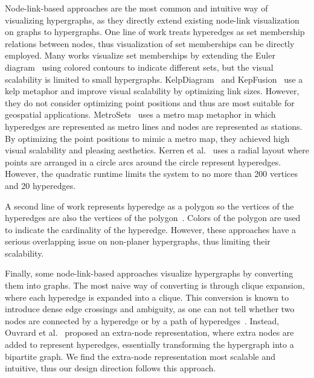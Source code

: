 Node-link-based approaches are the most common and intuitive way of visualizing hypergraphs, as they directly extend existing node-link visualization on graphs to hypergraphs.
One line of work treats hyperedges as set membership relations between nodes, thus visualization of set memberships can be directly employed.
Many works visualize set memberships by extending the Euler diagram~\cite{collins2009bubble, riche2010euler, simonetoo2016euler} using colored contours to indicate different sets, but the visual scalability is limited to small hypergraphs. 
KelpDiagram~\cite{dinkla2012kelp} and KepFusion~\cite{meulemans2013kelpfusion} use a kelp metaphor and improve visual scalability by optimizing link sizes.
However, they do not consider optimizing point positions and thus are most suitable for geospatial applications.
MetroSets~\cite{jacobsen2020metrosets} uses a metro map metaphor in which hyperedges are represented as metro lines and nodes are represented as stations.
By optimizing the point positions to mimic a metro map, they achieved high visual scalability and pleasing aesthetics.
Kerren et al.~\cite{kerren2013novel} uses a radial layout where points are arranged in a circle arcs around the circle represent hyperedges.
However, the quadratic runtime limits the system to no more than 200 vertices and 20 hyperedges.

A second line of work represents hyperedge as a polygon so the vertices of the hyperedges are also the vertices of the polygon~\cite{qu2017interactive, qu2021automatic, oliver2023scalable}.
Colors of the polygon are used to indicate the cardinality of the hyperedge.
However, these approaches have a serious overlapping issue on non-planer hypergraphs, thus limiting their scalability.

Finally, some node-link-based approaches visualize hypergraphs by converting them into graphs.
The most naive way of converting is through clique expansion, where each hyperedge is expanded into a clique.
This conversion is known to introduce dense edge crossings and ambiguity, as one can not tell whether two nodes are connected by a hyperedge or by a path of hyperedges~\cite{ouvrard2017hypergraph}. 
Instead, Ouvrard et al.~\cite{ouvrard2017hypergraph} proposed an extra-node representation, where extra nodes are added to represent hyperedges, essentially transforming the hypergraph into a bipartite graph.
We find the extra-node representation most scalable and intuitive, thus our design direction follows this approach.